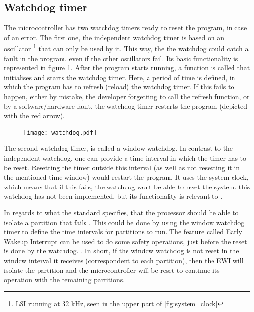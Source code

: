 \subsection{Watchdog timer}
The microcontroller has two watchdog timers ready to reset the program, in case of an error.
The first one, the independent watchdog timer is based on an oscillator
\footnote{LSI running at 32 kHz, seen in the upper part of
 \ref{fig:system_clock}}
that can only be used by it.
 This way,
the the watchdog could catch a fault in the program, even if the other
oscillators fail. Its basic functionality is represented in figure
\ref{fig:watchdog}. After the program starts running, a function is called
that initialises and starts the watchdog timer. Here, a period of time is defined, in which the program has to refresh (reload) the watchdog timer.
If this fails to happen, either by mistake, the developer forgetting to 
call the refresh function, or by a software/hardware fault, the watchdog 
timer restarts the program (depicted with the red arrow).

\begin{figure}[H]
\centering
\texttt{[image: watchdog.pdf]}
\label{fig:watchdog}
\end{figure}


The second watchdog timer, is called a window watchdog.
 In contrast 
to the independent watchdog, one can provide a time interval in which
the timer has to be reset. Resetting the timer outside this interval
(as well as not resetting it in the mentioned time window) would restart
the program. It uses the system clock, which means that if this fails,
the watchdog won\textquotesingle t be able to reset the system. this 
watchdog has not been implemented, but its functionality is relevant 
to \OSname{}.

In regards to what the standard specifies, that the processor should be able
to isolate a partition that fails \cite{page12}. This could be done by 
using the window watchdog timer to define the time intervals for partitions 
to run. The feature called Early Wakeup Interrupt can be used to do some
safety operations, just before the reset is done by the watchdog.
\cite{reference_manual_716}.
In short, if the window watchdog is not reset in the window interval it
receives (correspondent to each partition), then the EWI will isolate the
partition and the microcontroller will be reset to continue its operation
with the remaining partitions.


